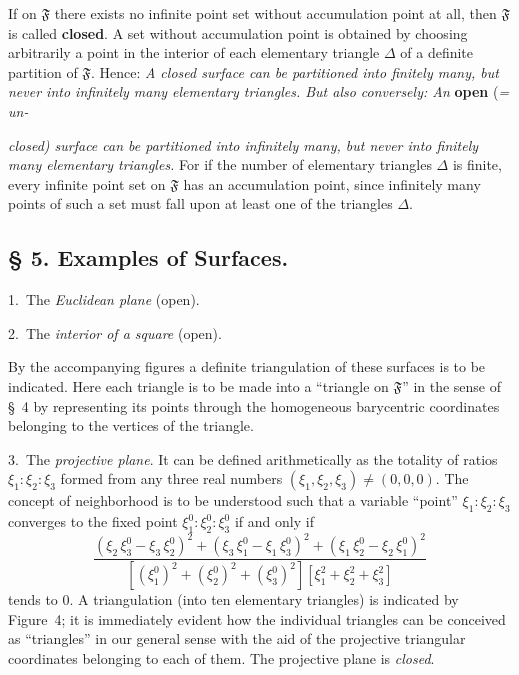 \documentclass{article}
\begin{document}
If on $\mathfrak{F}$ there exists no infinite point set without accumulation point at all, then $\mathfrak{F}$ is called \textbf{closed}. A set without accumulation point is obtained by choosing arbitrarily a point in the interior of each elementary triangle $\Delta$ of a definite partition of $\mathfrak{F}$. Hence: \emph{A closed surface can be partitioned into finitely many, but never into infinitely many elementary triangles. But also conversely: An} \textbf{open} (\emph{= un-}

\emph{closed) surface can be partitioned into infinitely many, but never into finitely many elementary triangles.} For if the number of elementary triangles $\Delta$ is finite, every infinite point set on $\mathfrak{F}$ has an accumulation point, since infinitely many points of such a set must fall upon at least one of the triangles $\Delta$.

\subsection*{§ 5. Examples of Surfaces.}

1.\ The \emph{Euclidean plane} (open).

2.\ The \emph{interior of a square} (open).


By the accompanying figures a definite triangulation of these surfaces is to be indicated. Here each triangle is to be made into a ``triangle on $\mathfrak{F}$'' in the sense of §~4 by representing its points through the homogeneous barycentric coordinates belonging to the vertices of the triangle.

3.\ The \emph{projective plane}. It can be defined arithmetically as the totality of ratios $\xi_1 : \xi_2 : \xi_3$ formed from any three real numbers $(\xi_1, \xi_2, \xi_3) \ne (0, 0, 0)$. The concept of neighborhood is to be understood such that a variable ``point'' $\xi_1 : \xi_2 : \xi_3$ converges to the fixed point $\xi_1^0 : \xi_2^0 : \xi_3^0$ if and only if
\[
\frac{(\xi_2\,\xi_3^0 - \xi_3\,\xi_2^0)^2 + (\xi_3\,\xi_1^0 - \xi_1\,\xi_3^0)^2 + (\xi_1\,\xi_2^0 - \xi_2\,\xi_1^0)^2}{[(\xi_1^0)^2 + (\xi_2^0)^2 + (\xi_3^0)^2] [\xi_1^2 + \xi_2^2 + \xi_3^2]}
\]
tends to 0. A triangulation (into ten elementary triangles) is indicated by Figure~4; it is immediately evident how the individual triangles can be conceived as ``triangles'' in our general sense with the aid of the projective triangular coordinates belonging to each of them. The projective plane is \emph{closed}.
\end{document}
